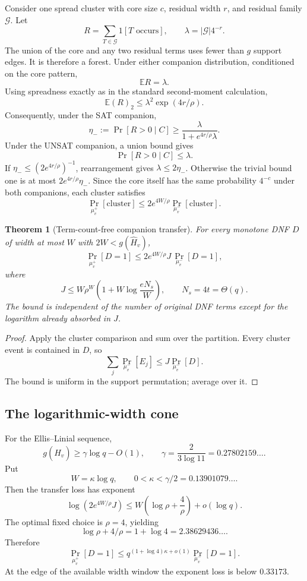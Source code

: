\documentclass[11pt]{article}
\newtheorem{theorem}{Theorem}
\begin{document}
Consider one spread cluster with core size $c$, residual width $r$, and residual family $\mathcal G$. Let
\[
R=\sum_{T\in\mathcal G}1[T\text{ occurs}],\qquad
\lambda=|\mathcal G|4^{-r}.
\]
The union of the core and any two residual terms uses fewer than $g$ support edges. It is therefore a forest. Under either companion distribution, conditioned on the core pattern,
\[
\mathbb E R=\lambda.
\]
Using spreadness exactly as in the standard second-moment calculation,
\[
\mathbb E(R)_2\le \lambda^2\exp(4r/\rho).
\]
Consequently, under the SAT companion,
\[
\eta_-:=\Pr[R>0\mid C]
\ge\frac{\lambda}{1+e^{4r/\rho}\lambda}.
\]
Under the UNSAT companion, a union bound gives
\[
\Pr[R>0\mid C]\le\lambda.
\]
If $\eta_-\le(2e^{4r/\rho})^{-1}$, rearrangement gives $\lambda\le2\eta_-$. Otherwise the trivial bound one is at most $2e^{4r/\rho}\eta_-$. Since the core itself has the same probability $4^{-c}$ under both companions, each cluster satisfies
\[
\Pr_{\mu_v^+}[\text{cluster}]
\le2e^{4W/\rho}
\Pr_{\mu_v^-}[\text{cluster}].
\]

\begin{theorem}[Term-count-free companion transfer]
For every monotone DNF $D$ of width at most $W$ with $2W<g(\widehat H_v)$,
\[
\boxed{
\Pr_{\mu_v^+}[D=1]
\le
2e^{4W/\rho}J\,
\Pr_{\mu_v^-}[D=1],
}
\]
where
\[
J\le W\rho^W\left(1+W\log\frac{eN_s}{W}\right),
\qquad N_s=4t=\Theta(q).
\]
The bound is independent of the number of original DNF terms except for the logarithm already absorbed in $J$.
\end{theorem}
\begin{proof}
Apply the cluster comparison and sum over the partition. Every cluster event is contained in $D$, so
\[
\sum_j\Pr_{\mu_v^-}[E_j]\le J\Pr_{\mu_v^-}[D].
\]
The bound is uniform in the support permutation; average over it.
\end{proof}

\subsection{The logarithmic-width cone}
For the Ellis--Linial sequence,
\[
g(\widehat H_v)\ge\gamma\log q-O(1),
\qquad \gamma=\frac{2}{3\log11}=0.27802159\ldots.
\]
Put
\[
W=\kappa\log q,
\qquad 0<\kappa<\gamma/2=0.13901079\ldots.
\]
Then the transfer loss has exponent
\[
\log\left(2e^{4W/\rho}J\right)
\le W\left(\log\rho+\frac4\rho\right)+o(\log q).
\]
The optimal fixed choice is $\rho=4$, yielding
\[
\log\rho+4/\rho=1+\log4=2.38629436\ldots.
\]
Therefore
\[
\boxed{
\Pr_{\mu_v^+}[D=1]
\le
q^{(1+\log4)\kappa+o(1)}
\Pr_{\mu_v^-}[D=1].
}
\]
At the edge of the available width window the exponent loss is below $0.33173$.
\end{document}

